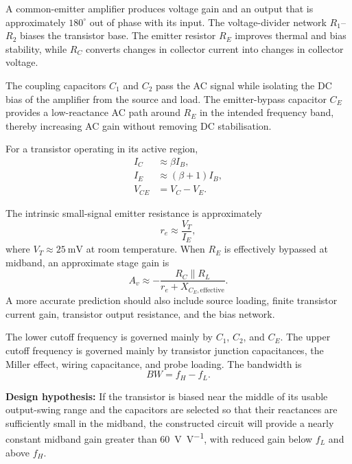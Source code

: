 \documentclass[11pt,a4paper]{article}
\begin{document}
\begin{examplebox}
A common-emitter amplifier produces voltage gain and an output that is
approximately $180^\circ$ out of phase with its input. The voltage-divider
network $R_1$--$R_2$ biases the transistor base. The emitter resistor $R_E$
improves thermal and bias stability, while $R_C$ converts changes in collector
current into changes in collector voltage.

The coupling capacitors $C_1$ and $C_2$ pass the AC signal while isolating the
DC bias of the amplifier from the source and load. The emitter-bypass
capacitor $C_E$ provides a low-reactance AC path around $R_E$ in the intended
frequency band, thereby increasing AC gain without removing DC stabilisation.

For a transistor operating in its active region,
\begin{align}
I_C &\approx \beta I_B,\\
I_E &\approx (\beta+1)I_B,\\
V_{CE} &= V_C-V_E .
\end{align}

The intrinsic small-signal emitter resistance is approximately
\begin{equation}
r_e \approx \frac{V_T}{I_E},
\end{equation}
where $V_T\approx\SI{25}{\milli\volt}$ at room temperature. When $R_E$ is
effectively bypassed at midband, an approximate stage gain is
\begin{equation}
A_v \approx -\frac{R_C\parallel R_L}{r_e+X_{C_E,\mathrm{effective}}}.
\end{equation}
A more accurate prediction should also include source loading, finite
transistor current gain, transistor output resistance, and the bias network.

The lower cutoff frequency is governed mainly by $C_1$, $C_2$, and $C_E$.
The upper cutoff frequency is governed mainly by transistor junction
capacitances, the Miller effect, wiring capacitance, and probe loading.
The bandwidth is
\begin{equation}
BW=f_H-f_L.
\end{equation}

\textbf{Design hypothesis:}
If the transistor is biased near the middle of its usable output-swing range
and the capacitors are selected so that their reactances are sufficiently
small in the midband, the constructed circuit will provide a nearly constant
midband gain greater than \SI{60}{\volt\per\volt}, with reduced gain below
$f_L$ and above $f_H$.
\end{examplebox}
\end{document}
